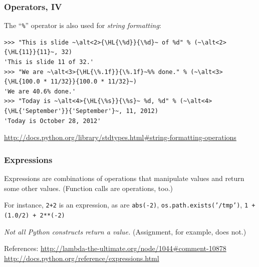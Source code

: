 \documentclass[english,serif,mathserif,xcolor=pdftex,dvipsnames,table]{beamer}
\begin{document}
\begin{frame}[fragile]
  \frametitle{Operators, IV}
  The ``\texttt{\%}'' operator is also used for \emph{string
    formatting}:
\begin{lstlisting}[showstringspaces=false]
>>> "This is slide ~\alt<2>{\HL{\%d}}{\%d}~ of %d" % (~\alt<2>{\HL{11}}{11}~, 32)
'This is slide 11 of 32.'
>>> "We are ~\alt<3>{\HL{\%.1f}}{\%.1f}~%% done." % (~\alt<3>{\HL{100.0 * 11/32}}{100.0 * 11/32}~)
'We are 40.6% done.'
>>> "Today is ~\alt<4>{\HL{\%s}}{\%s}~ %d, %d" % (~\alt<4>{\HL{'September'}}{'September'}~, 11, 2012)
'Today is October 28, 2012'
\end{lstlisting}


  \begin{references}
    \url{http://docs.python.org/library/stdtypes.html#string-formatting-operations}
  \end{references}
\end{frame}


\begin{frame}[fragile]
  \frametitle{Expressions}

  Expressions are combinations of operations that manipulate values
  and return some other values.  (Function calls are operations, too.)

  \+
  For instance, \texttt{2+2} is an expression, as are
  \texttt{abs(-2)}, \texttt{os.path.exists('/tmp')},
  \texttt{1 + (1.0/2) + 2**(-2)}

  \+
  \emph{Not all Python constructs return a value.}
  (Assignment, for example, does not.)

  \+\scriptsize
  References:
  \url{http://lambda-the-ultimate.org/node/1044#comment-10878}
  \url{http://docs.python.org/reference/expressions.html}

\end{frame}
\end{document}
